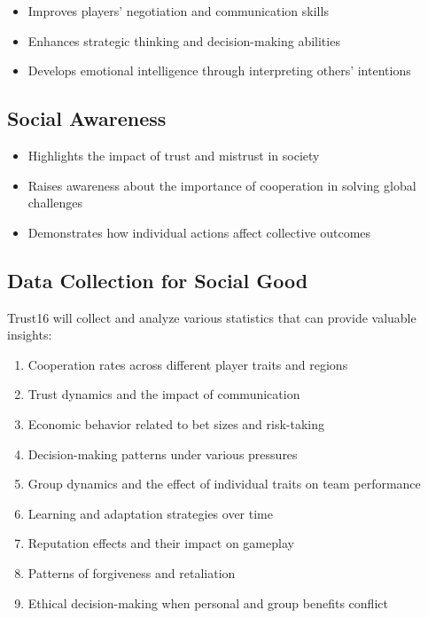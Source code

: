 \documentclass[]{article}
\begin{document}
\begin{itemize}
\item Improves players' negotiation and communication skills
\item Enhances strategic thinking and decision-making abilities
\item Develops emotional intelligence through interpreting others' intentions
\end{itemize}

\subsection{Social Awareness}

\begin{itemize}
\item Highlights the impact of trust and mistrust in society
\item Raises awareness about the importance of cooperation in solving global challenges
\item Demonstrates how individual actions affect collective outcomes
\end{itemize}

\subsection{Data Collection for Social Good}

Trust16 will collect and analyze various statistics that can provide valuable insights:

\begin{enumerate}
\item Cooperation rates across different player traits and regions
\item Trust dynamics and the impact of communication
\item Economic behavior related to bet sizes and risk-taking
\item Decision-making patterns under various pressures
\item Group dynamics and the effect of individual traits on team performance
\item Learning and adaptation strategies over time
\item Reputation effects and their impact on gameplay
\item Patterns of forgiveness and retaliation
\item Ethical decision-making when personal and group benefits conflict
\end{enumerate}
\end{document}
